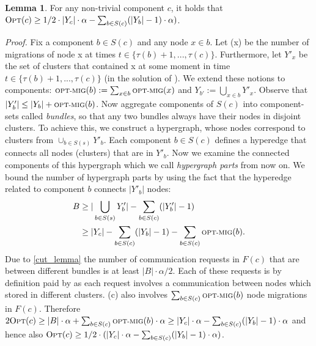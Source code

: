 \documentclass[xcolor=dvipsnames, tikz, 11pt]{article}
\newcommand{\nl}{\newline}
\newcommand{\optmig}{\text{\scriptsize OPT-MIG}}
\newcommand{\opt}{\text{O{\scriptsize PT}}}
\theoremstyle{definition}
\newtheorem{lemma}[defi]{Lemma}
\begin{document}
	\begin{lemma}
		\label{lem11}
		For any non-trivial component $c$, it holds that $\opt(c)\geq1/2\cdot|Y_c|\cdot\alpha-\sum_{b\in S(c)}(|Y_b|-1)\cdot\alpha)$.
	\end{lemma}

	\textit{Proof.} Fix a component $b\in S(c)$ and any node $x\in b$. Let \optmig(x) be the number of \opt migrations of node x at times $t\in\{\tau(b)+1,...,\tau(c)\}$. Furthermore, let $Y'_x$ be the set of clusters that contained x at some moment in time $t\in\{\tau(b)+1,...,\tau(c)\}$ (in the solution of \opt). We extend these notions to components: $\optmig{}(b):=\sum_{x\in b}\optmig(x)$ and $Y_{b'}:=\bigcup_{x\in b}Y'_x$. Observe that $|Y_b'|\leq|Y_b|+\optmig(b)$.\nl
	Now aggregate components of $S(c)$ into component-sets called \textit{bundles}, so that any two bundles always have their nodes in disjoint clusters. To achieve this, we construct a hypergraph, whose nodes correspond to clusters from $\cup_{b\in S(s)}Y'_b$. Each component $b\in S(c)$ defines a hyperedge that connects all nodes (clusters) that are in $Y'_b$. Now we examine the connected components of this hypergraph which we call  \textit{hypergraph parts} from now on.
	We bound the number of hypergraph parts by using the fact that the hyperedge related to component $b$ connects $|Y'_b|$ nodes:
	\begin{align*}
		B&\geq|\bigcup_{b\in S(s)}Y'_b|-\sum_{b\in S(c)}(|Y'_b|-1)\\
		&\geq|Y_c|-\sum_{b\in S(c)}(|Y_b|-1)-\sum_{b\in S(c)}\optmig(b).
	\end{align*}
	Due to \cref{cut_lemma} the number of communication requests in $F(c)$ that are between different bundles is at least $|B|\cdot\alpha/2$. Each of these requests is by definition paid by \opt as each request involves a communication between nodes which \opt stored in different clusters.
	\opt(c) also involves $\sum_{b\in S(c)}\optmig(b)$ node migrations in $F(c)$.\nl
	Therefore $2\opt{}(c)\geq|B|\cdot\alpha+\sum_{b\in S(c)}\optmig(b)\cdot\alpha\geq|Y_c|\cdot\alpha-\sum_{b\in S(c)}(|Y_b|-1)\cdot\alpha$ and hence also
	$\opt(c)\geq1/2\cdot(|Y_c|\cdot\alpha-\sum_{b\in S(c)}(|Y_b|-1)\cdot\alpha)$.\nl
\end{document}
